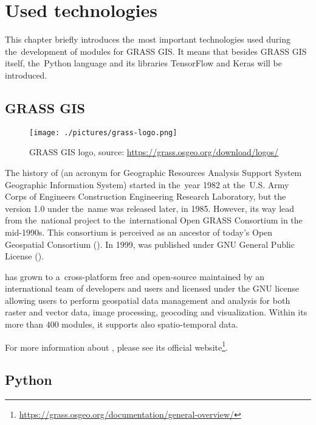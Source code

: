 \chapter{Used technologies}
\label{technologies}

This chapter briefly introduces the~most important technologies used during
the~development of modules for GRASS GIS. It means that besides GRASS GIS itself, 
the~Python language and its libraries TensorFlow and Keras will be introduced.

\section{GRASS GIS}
\label{grass}

\begin{figure}[H]
   \centering
	\texttt{[image: ./pictures/grass-logo.png]}
	\caption[GRASS GIS logo]{GRASS GIS logo, source: \url{https://grass.osgeo.org/download/logos/}}
      \label{fig:grass-logo}
\end{figure}

The history of   (an acronym for Geographic Resources Analysis 
Support System Geographic Information System) started in the~year 1982 at the~U.S. 
Army Corps of Engineers Construction Engineering Research Laboratory, but the~
version 1.0 under the~name  was released later, in 1985. However, its 
way lead from the~national project to the~international Open GRASS Consortium in 
the mid-1990s. This consortium is perceived as an ancestor of today's Open 
Geospatial Consortium (). In 1999,   was published 
under GNU General Public License ().

  has grown to a~cross-platform free and open-source  
maintained by an international team of developers and users and licensed under 
the GNU  license allowing users to perform geospatial data management 
and analysis for both raster and vector data, image processing, geocoding and
visualization. Within its more than 400 modules, it supports also 
spatio-temporal data.

For more information about  , please see its official 
website\footnote{\url{https://grass.osgeo.org/documentation/general-overview/}}.

\section{Python}
\label{python}


